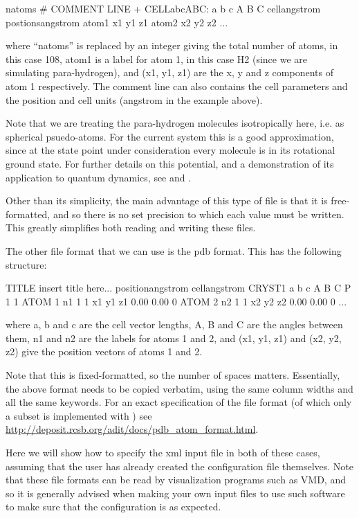 \documentclass[11pt,english,fleqn]{report}
\newenvironment{code}{%
\footnotesize 
\verbatim
}{
\endverbatim
\normalsize
}
\begin{document}
\begin{code}
natoms
# COMMENT LINE + CELL{abcABC}: a b c A B C cell{angstrom} postions{angstrom}
atom1   x1  y1  z1
atom2   x2  y2  z2
...
\end{code}
where {}``natoms'' is replaced by an integer giving the total number
of atoms, in this case 108, atom1 is a label for atom 1, in this case
H2 (since we are simulating para-hydrogen), and (x1, y1, z1) are the
x, y and z components of atom 1 respectively. The comment line can
also contains the cell parameters and the position and cell units
(angstrom in the example above).

Note that we are treating the para-hydrogen molecules isotropically here,
i.e. as spherical psuedo-atoms.
For the current system this is a good approximation, since at 
the state point under consideration every molecule is in its 
rotational ground state. For further details on this potential,
and a demonstration of its application to quantum dynamics, see
\cite{silv-gold78jcp} and \cite{mill-mano05jcp}.

Other than its simplicity, the main advantage of this type of file
is that it is free-formatted, and so there is no set precision
to which each value must be written. This greatly simplifies
both reading and writing these files.

The other file format that we can use is the pdb format. This
has the following structure:

\begin{code}
TITLE insert title here... position{angstrom} cell{angstrom}
CRYST1        a        b        c      A      B      C P 1           1
ATOM      1   n1   1     1          x1      y1      z1  0.00  0.00             0
ATOM      2   n2   1     1          x2      y2      z2  0.00  0.00             0
...
\end{code}
where a, b and c are the cell vector lengths, A, B and C are the angles between
them, n1 and n2 are the labels for atoms 1 and 2, and (x1, y1, z1)
and (x2, y2, z2) give the position vectors of atoms 1 and 2. 

Note that this is
fixed-formatted, so the number of spaces matters. Essentially, the
above format needs to be copied verbatim, using the same column
widths and all the same keywords. For an exact specification
of the file format (of which only a subset is implemented 
with \ipi) see
\url{http://deposit.rcsb.org/adit/docs/pdb_atom_format.html}.

Here we will show how to specify the xml input file
in both of these cases, assuming that the user has already
created the configuration file themselves.
Note that these file formats can be read by
visualization programs such as VMD, and so it is generally advised 
when making your own input files to
use such software to make sure that the configuration is as expected.
\end{document}
